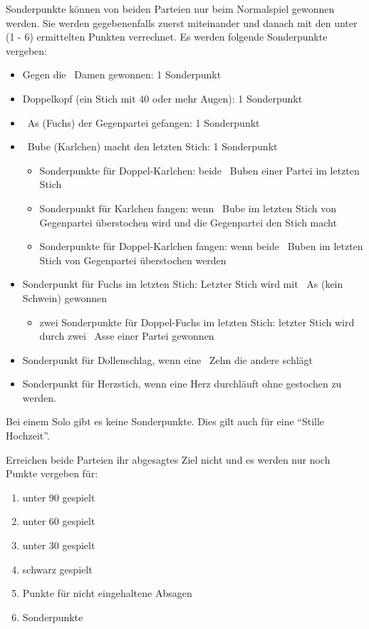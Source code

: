 \documentclass{scrartcl}
\begin{document}
Sonderpunkte können von beiden Parteien nur beim Normalspiel gewonnen werden.  Sie werden gegebenenfalls zuerst miteinander und danach mit den unter (1 - 6) ermittelten Punkten verrechnet.  Es werden folgende Sonderpunkte vergeben:
\begin{itemize}
  \item Gegen die \Kreuz\ Damen gewonnen: 1 Sonderpunkt
  \item Doppelkopf (ein Stich mit 40 oder mehr Augen): 1 Sonderpunkt
  \item \Karo\ As (Fuchs) der Gegenpartei gefangen: 1 Sonderpunkt
  \item \optional \Kreuz\ Bube (Karlchen) macht den letzten Stich: 1 Sonderpunkt
    \begin{itemize}
      \item {} Sonderpunkte für Doppel-Karlchen: beide \Kreuz\ Buben einer Partei im letzten Stich
      \item {} Sonderpunkt für Karlchen fangen: wenn \Kreuz\ Bube im letzten Stich von Gegenpartei überstochen wird und
	die Gegenpartei den Stich macht
      \item {} Sonderpunkte für Doppel-Karlchen fangen: wenn beide \Kreuz\ Buben im letzten Stich von Gegenpartei überstochen werden
    \end{itemize}
  \item {} Sonderpunkt für Fuchs im letzten Stich: Letzter Stich wird mit \Karo\ As (kein Schwein) gewonnen
    \begin{itemize}
      \item \optional zwei Sonderpunkte für Doppel-Fuchs im letzten Stich: letzter Stich wird durch zwei \Karo\ Asse einer Partei gewonnen
    \end{itemize}
  \item {} Sonderpunkt für Dollenschlag, wenn eine \Herz\ Zehn die andere schlägt
  \item {} Sonderpunkt für Herzstich, wenn eine Herz
    durchläuft ohne gestochen zu werden.
\end{itemize}

Bei einem Solo gibt es keine Sonderpunkte. Dies gilt auch für eine "`Stille Hochzeit"'.

Erreichen beide Parteien ihr abgesagtes Ziel nicht und es werden nur noch Punkte vergeben für:
\begin{enumerate}
  \item unter 90 gespielt
  \item unter 60 gespielt
  \item unter 30 gespielt
  \item schwarz gespielt
  \item Punkte für nicht eingehaltene Absagen
  \item Sonderpunkte
\end{enumerate}
\end{document}

